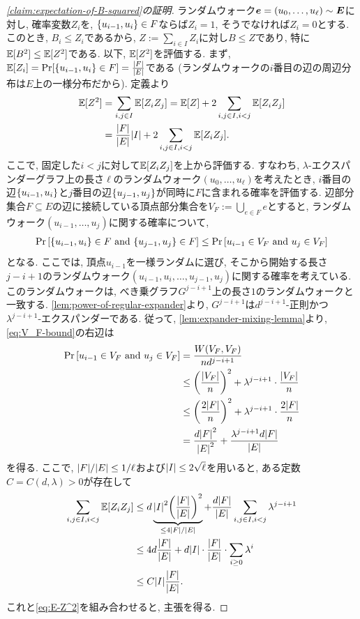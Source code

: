 \begin{proof}[\cref{claim:expectation-of-B-squared}の証明]
  ランダムウォーク$\boldsymbol{e}=(u_0,\dots,u_\ell)\sim\boldsymbol{E}$に対し, 確率変数$Z_i$を, $\qty{u_{i-1},u_i}\in F$ならば$Z_i=1$, そうでなければ$Z_i=0$とする.
  このとき, $B_i\le Z_i$であるから, $Z:=\sum_{i\in I} Z_i$に対し$B\le Z$であり, 特に$\operatorname*{\mathbb{E}}[B^2]\le \operatorname*{\mathbb{E}}[Z^2]$である.
  以下, $\operatorname*{\mathbb{E}}[Z^2]$を評価する. まず, $\operatorname*{\mathbb{E}}[Z_i]=\Pr[\qty{u_{i-1},u_i}\in F]=\frac{\abs{F}}{\abs{E}}$である (ランダムウォークの$i$番目の辺の周辺分布は$E$上の一様分布だから).
  定義より
  \begin{align}
    \operatorname*{\mathbb{E}}[Z^2] &= \sum_{i,j\in I} \operatorname*{\mathbb{E}}[Z_i Z_j] = \operatorname*{\mathbb{E}}[Z] + 2 \sum_{i,j\in I,i<j} \operatorname*{\mathbb{E}}[Z_i Z_j] \nonumber \\
    &= \frac{\abs{F}}{\abs{E}} \abs{I} + 2 \sum_{i,j\in I,i<j} \operatorname*{\mathbb{E}}[Z_iZ_j]. \label{eq:E-Z^2}
  \end{align}
  ここで, 固定した$i<j$に対して$\operatorname*{\mathbb{E}}[Z_iZ_j]$を上から評価する.
  すなわち, $\lambda$-エクスパンダーグラフ上の長さ$\ell$のランダムウォーク$(u_0,\dots,u_\ell)$を考えたとき, $i$番目の辺$\qty{u_{i-1},u_i}$と$j$番目の辺$\qty{u_{j-1},u_j}$が同時に$F$に含まれる確率を評価する.
  辺部分集合$F\subseteq E$の辺に接続している頂点部分集合を$V_F:=\bigcup_{e\in F} e$とすると, ランダムウォーク$(u_{i-1},\dots,u_j)$に関する確率について,
  \begin{align}
    \Pr\qty[\qty{u_{i-1},u_i}\in F \text{ and } \qty{u_{j-1},u_j}\in F] \le \Pr\qty[u_{i-1}\in V_F\text{ and }u_j\in V_F] \label{eq:V_F-bound}
  \end{align}
  となる. ここでは, 頂点$u_{i-1}$を一様ランダムに選び, そこから開始する長さ$j-i+1$のランダムウォーク$(u_{i-1},u_i,\dots,u_{j-1},u_j)$に関する確率を考えている.
  このランダムウォークは, べき乗グラフ$G^{j-i+1}$上の長さ$1$のランダムウォークと一致する.
  \cref{lem:power-of-regular-expander}より, $G^{j-i+1}$は$d^{j-i+1}$-正則かつ$\lambda^{j-i+1}$-エクスパンダーである.
  従って, \cref{lem:expander-mixing-lemma}より, \cref{eq:V_F-bound}の右辺は
  \begin{align*}
    \Pr\qty[u_{i-1}\in V_F\text{ and }u_j\in V_F] &= \frac{W(V_F,V_F)}{nd^{j-i+1}} \\
    &\le \qty(\frac{\abs{V_F}}{n})^2 + \lambda^{j-i+1} \cdot \frac{\abs{V_F}}{n} \\
    &\le \qty(\frac{2\abs{F}}{n})^2 + \lambda^{j-i+1} \cdot \frac{2\abs{F}}{n} \\
    &= \frac{d\abs{F}^2}{\abs{E}^2} + \frac{\lambda^{j-i+1}d\abs{F}}{\abs{E}}
  \end{align*}
  を得る. ここで,
  $\abs{F}/\abs{E} \le 1/\ell$および$\abs{I} \le 2\sqrt{\ell}$を用いると,
  ある定数$C=C(d,\lambda)>0$が存在して
  \begin{align*}
    \sum_{i,j\in I,i<j} \operatorname*{\mathbb{E}}[Z_iZ_j] &\le d\underbrace{\abs{I}^2 \qty(\frac{\abs{F}}{\abs{E}})^2}_{\le 4\abs{F}/\abs{E}} + \frac{d\abs{F}}{\abs{E}} \sum_{i,j\in I,i<j} \lambda^{j-i+1} \\
    &\le 4d \frac{\abs{F}}{\abs{E}} + d\abs{I}\cdot \frac{\abs{F}}{\abs{E}} \cdot \sum_{i\ge 0} \lambda^i \\
    &\le C\abs{I}\frac{\abs{F}}{\abs{E}}.
  \end{align*}
  これと\cref{eq:E-Z^2}を組み合わせると, 主張を得る.
\end{proof}

